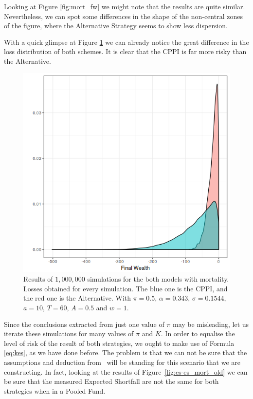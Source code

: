 Looking at Figure \ref{fig:mort_fw} we might note that the results are quite similar. Nevertheless, we can spot some differences in the shape of the non-central zones of the figure, where the Alternative Strategy seems to show less dispersion.

With a quick glimpse at Figure \ref{fig:mort_loss} we can already notice the great difference in the loss distribution of both schemes. It is clear that the CPPI is far more risky than the Alternative.

\begin{figure}[h]
    \centering
    \includegraphics[scale=0.75]{./images/loss_both_mort.png}
    \caption{Results of $1,000,000$ simulations for the both models with mortality. Losses obtained for every simulation. The blue one is the CPPI, and the red one is the Alternative. With $\pi = 0.5$, $\alpha = 0.343$, $\sigma = 0.1544$, $a = 10$, $T = 60$, $A = 0.5$ and $w = 1$.}
    \label{fig:mort_loss}
\end{figure}

Since the conclusions extracted from just one value of $\pi$ may be misleading, let us iterate these simulations for many values of $\pi$ and $K$. In order to equalise the level of risk of the result of both strategies, we ought to make use of Formula \ref{eq:kes}, as we have done before. The problem is that we can not be sure that the assumptions and deduction from~\cite{a:guillen-optimisation} will be standing for this scenario that we are constructing. In fact, looking at the results of Figure~\ref{fig:es-es_mort_old} we can be sure that the measured Expected Shortfall are not the same for both strategies when in a Pooled Fund.

